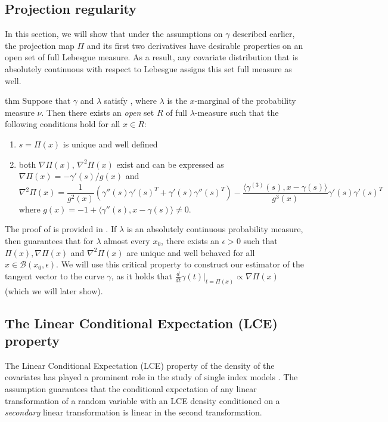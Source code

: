 \documentclass[11pt]{article}
\begin{document}
\subsection{Projection regularity}
In this section, we will show that under the assumptions on $\gamma$ described earlier, the projection map $\Pi$ and its first two derivatives have desirable properties on an open set of full Lebesgue measure. As a result, any covariate distribution that is absolutely continuous with respect to Lebesgue assigns this set full measure as well.  

\begin{restatable}[Differentiability of $\Pi$]{thm}{} \label{thm: differentiability of pi}
    Suppose that $\gamma$ and $\lambda$ satisfy , where $\lambda$ is the $x$-marginal of the probability measure $\nu$. Then there exists an \textit{open} set $R$ of full $\lambda$-measure such that the following conditions hold for all $x \in R$:
    \begin{enumerate}
        \item $s = \Pi(x)$ is unique and well defined
        \item both $\nabla\Pi(x)$, $\nabla^2\Pi(x)$ exist and can be expressed as $\nabla\Pi(x)  = -\gamma'(s)/g(x)$ and 
        \begin{equation}
            \nabla^2\Pi(x) = \frac{1}{g^2(x)}\left(\gamma''(s)\gamma'(s)^T + \gamma'(s)\gamma''(s)^T\right)- \frac{\langle\gamma^{(3)}(s), x - \gamma(s)\rangle}{g^3(x)}\gamma'(s)\gamma'(s)^T
        \end{equation}
        where $g(x) = -1 + \langle\gamma''(s), x-\gamma(s)\rangle \neq 0$. 
    \end{enumerate}
\end{restatable}

The proof of  is provided in . If $\lambda$ is an absolutely continuous probability measure, then  guarantees that for $\lambda$ almost every $x_0$, there exists an $\epsilon >0$ such that $\Pi(x), \nabla\Pi(x)$ and $\nabla^2\Pi(x)$ are unique and well behaved for all $x \in \mathcal{B}(x_0, \epsilon).$ We will use this critical property to construct our estimator of the tangent vector to the curve $\gamma$, as it holds that $\frac{d}{dt}\gamma(t)\Big|_{t = \Pi(x)} \propto \nabla\Pi(x)$ (which we will later show).

\subsection{The Linear Conditional Expectation (LCE) property}
The Linear Conditional Expectation (LCE) property of the density of the covariates has played a prominent role in the study of single index models \cite{li1989regression, li1991sliced}. The assumption guarantees that the conditional expectation of any linear transformation of a random variable with an LCE density conditioned on a \textit{secondary} linear transformation is linear in the second transformation. 
\end{document}
